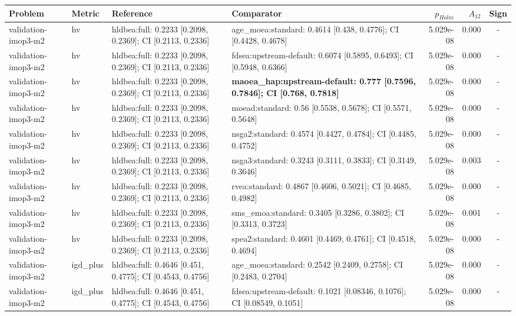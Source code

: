 \begin{tabular}{llllrrc}
\toprule
Problem & Metric & Reference & Comparator & $p_{Holm}$ & $A_{12}$ & Sign \\
\midrule
validation-imop3-m2 & hv & hldbea:full: 0.2233 [0.2098, 0.2369]; CI [0.2113, 0.2336] & age\_moea:standard: 0.4614 [0.438, 0.4776]; CI [0.4428, 0.4678] & 5.029e-08 & 0.000 & - \\
validation-imop3-m2 & hv & hldbea:full: 0.2233 [0.2098, 0.2369]; CI [0.2113, 0.2336] & fdsea:upstream-default: 0.6074 [0.5895, 0.6493]; CI [0.5948, 0.6366] & 5.029e-08 & 0.000 & - \\
validation-imop3-m2 & hv & hldbea:full: 0.2233 [0.2098, 0.2369]; CI [0.2113, 0.2336] & \textbf{maoea\_hap:upstream-default: 0.777 [0.7596, 0.7846]; CI [0.768, 0.7818]} & 5.029e-08 & 0.000 & - \\
validation-imop3-m2 & hv & hldbea:full: 0.2233 [0.2098, 0.2369]; CI [0.2113, 0.2336] & moead:standard: 0.56 [0.5538, 0.5678]; CI [0.5571, 0.5648] & 5.029e-08 & 0.000 & - \\
validation-imop3-m2 & hv & hldbea:full: 0.2233 [0.2098, 0.2369]; CI [0.2113, 0.2336] & nsga2:standard: 0.4574 [0.4427, 0.4784]; CI [0.4485, 0.4752] & 5.029e-08 & 0.000 & - \\
validation-imop3-m2 & hv & hldbea:full: 0.2233 [0.2098, 0.2369]; CI [0.2113, 0.2336] & nsga3:standard: 0.3243 [0.3111, 0.3833]; CI [0.3149, 0.3646] & 5.029e-08 & 0.003 & - \\
validation-imop3-m2 & hv & hldbea:full: 0.2233 [0.2098, 0.2369]; CI [0.2113, 0.2336] & rvea:standard: 0.4867 [0.4606, 0.5021]; CI [0.4685, 0.4982] & 5.029e-08 & 0.000 & - \\
validation-imop3-m2 & hv & hldbea:full: 0.2233 [0.2098, 0.2369]; CI [0.2113, 0.2336] & sms\_emoa:standard: 0.3405 [0.3286, 0.3802]; CI [0.3313, 0.3723] & 5.029e-08 & 0.001 & - \\
validation-imop3-m2 & hv & hldbea:full: 0.2233 [0.2098, 0.2369]; CI [0.2113, 0.2336] & spea2:standard: 0.4601 [0.4469, 0.4761]; CI [0.4518, 0.4694] & 5.029e-08 & 0.000 & - \\
validation-imop3-m2 & igd\_plus & hldbea:full: 0.4646 [0.451, 0.4775]; CI [0.4543, 0.4756] & age\_moea:standard: 0.2542 [0.2409, 0.2758]; CI [0.2483, 0.2704] & 5.029e-08 & 0.000 & - \\
validation-imop3-m2 & igd\_plus & hldbea:full: 0.4646 [0.451, 0.4775]; CI [0.4543, 0.4756] & fdsea:upstream-default: 0.1021 [0.08346, 0.1076]; CI [0.08549, 0.1051] & 5.029e-08 & 0.000 & - \\

\end{tabular}
